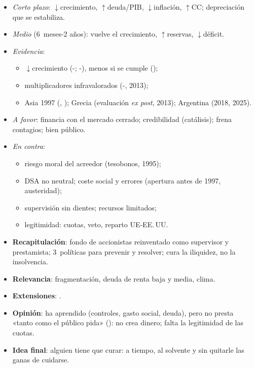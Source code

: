 \documentclass{article}
\begin{document}
\begin{columnas}
\begin{itemize}
\item \emph{Corto plazo}: $\downarrow$crecimiento, $\uparrow$deuda/PIB, $\downarrow$inflación, $\uparrow$CC; depreciación que se estabiliza.
\item \emph{Medio} (6~meses-2 años): vuelve el crecimiento, $\uparrow$reservas, $\downarrow$déficit.
\item \emph{Evidencia}:
  \begin{itemize}
  \item $\downarrow$crecimiento (-; -), menos si se cumple ();
  \item multiplicadores infravalorados (-, 2013);
  \item Asia 1997 (, ); Grecia (evaluación \emph{ex post}, 2013); Argentina (2018, 2025).
  \end{itemize}
\end{itemize}

\begin{itemize}
\item \emph{A favor}: financia con el mercado cerrado; credibilidad (catálisis); frena contagios; bien público.
\item \emph{En contra}:
  \begin{itemize}
  \item riesgo moral del acreedor (tesobonos, 1995);
  \item DSA no neutral; coste social y errores (apertura antes de 1997, austeridad);
  \item supervisión sin dientes; recursos limitados;
  \item legitimidad: cuotas, veto, reparto UE-EE.\,UU.
  \end{itemize}
\end{itemize}

\begin{itemize}
\item \textbf{Recapitulación}: fondo de accionistas reinventado como supervisor y prestamista; 3~políticas para prevenir y resolver; cura la iliquidez, no la insolvencia.
\item \textbf{Relevancia}: fragmentación, deuda de renta baja y media, clima.
\item \textbf{Extensiones}:     .
\item \textbf{Opinión}: ha aprendido (controles, gasto social, deuda), pero no presta «tanto como el público pida» (): no crea dinero; falta la legitimidad de las cuotas.
\item \textbf{Idea final}: alguien tiene que curar: a tiempo, al solvente y sin quitarle las ganas de cuidarse.
\end{itemize}


\end{columnas}
\end{document}
